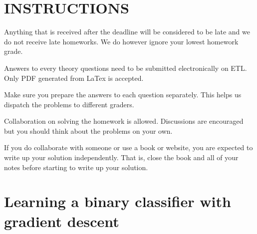 \documentclass{article}
\begin{document}
\pagestyle{fancy}

\section*{INSTRUCTIONS}

\begin{itemize*}
\item Anything
  that is received after the deadline will be considered to be late and we do not receive late homeworks. We do however ignore your lowest homework grade. 
\item Answers to every theory questions need to be submitted
  electronically on ETL. Only PDF generated from LaTex is accepted.
\item Make sure you prepare the answers to each question
  separately. This helps us dispatch the problems to different graders.
\item Collaboration on solving the homework is allowed. Discussions
  are encouraged but you should think about the problems on your own. 
\item If you do collaborate with someone or use a book or website, you
  are expected to write up your solution independently.  That is,
  close the book and all of your notes before starting to write up
  your solution. 
\end{itemize*}


\section{Learning a binary classifier with gradient descent}
\end{document}

